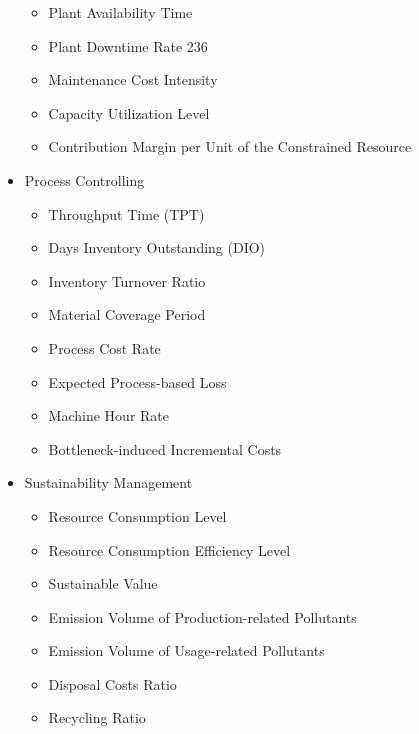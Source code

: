 \documentclass[]{book}
\providecommand{\tightlist}{%
  \setlength{\itemsep}{0pt}\setlength{\parskip}{0pt}}
\begin{document}
\begin{itemize}
  \begin{itemize}
  \tightlist
  \item
    Plant Availability Time\\
  \item
    Plant Downtime Rate 236
  \item
    Maintenance Cost Intensity\\
  \item
    Capacity Utilization Level\\
  \item
    Contribution Margin per Unit of the Constrained Resource
  \end{itemize}
\item
  Process Controlling

  \begin{itemize}
  \tightlist
  \item
    Throughput Time (TPT)
  \item
    Days Inventory Outstanding (DIO)\\
  \item
    Inventory Turnover Ratio\\
  \item
    Material Coverage Period\\
  \item
    Process Cost Rate
  \item
    Expected Process-based Loss
  \item
    Machine Hour Rate\\
  \item
    Bottleneck-induced Incremental Costs
  \end{itemize}
\item
  Sustainability Management

  \begin{itemize}
  \tightlist
  \item
    Resource Consumption Level\\
  \item
    Resource Consumption Efficiency Level\\
  \item
    Sustainable Value
  \item
    Emission Volume of Production-related Pollutants
  \item
    Emission Volume of Usage-related Pollutants\\
  \item
    Disposal Costs Ratio\\
  \item
    Recycling Ratio
  \end{itemize}
\end{itemize}
\end{document}
